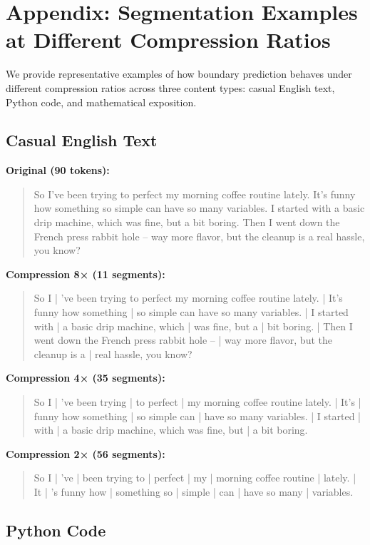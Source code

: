 
\section{Appendix: Segmentation Examples at Different Compression Ratios}
\label{appendix:segmentation}

We provide representative examples of how boundary prediction behaves under different compression ratios across three content types: casual English text, Python code, and mathematical exposition.

\subsection{Casual English Text}

\textbf{Original (90 tokens):}
\begin{quote}
\small
So I've been trying to perfect my morning coffee routine lately. It's funny how something so simple can have so many variables. I started with a basic drip machine, which was fine, but a bit boring. Then I went down the French press rabbit hole – way more flavor, but the cleanup is a real hassle, you know?
\end{quote}

\textbf{Compression 8× (11 segments):}
\begin{quote}
\small
So I | 've been trying to perfect my morning coffee routine lately. | It's funny how something | so simple can have so many variables. | I started with | a basic drip machine, which | was fine, but a | bit boring. | Then I went down the French press rabbit hole – | way more flavor, but the cleanup is a | real hassle, you know?
\end{quote}

\textbf{Compression 4× (35 segments):}
\begin{quote}
\small
So I | 've been trying | to perfect | my morning coffee routine lately. | It's | funny how something | so simple can | have so many variables. | I started | with | a basic drip machine, which was fine, but | a bit boring.
\end{quote}

\textbf{Compression 2× (56 segments):}
\begin{quote}
\small
So I | 've | been trying to | perfect | my | morning coffee routine | lately. | It | 's funny how | something so | simple | can | have so many | variables.
\end{quote}

\subsection{Python Code}

